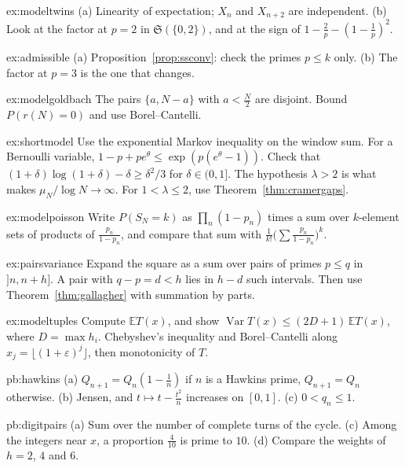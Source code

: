 \begin{hint}{ex:modeltwins}
(a) Linearity of expectation; $X_n$ and $X_{n+2}$ are independent. (b) Look at the factor at $p=2$ in $\mathfrak S(\{0,2\})$, and at the sign of $1-\frac2p-(1-\frac1p)^2$.
\end{hint}
\begin{hint}{ex:admissible}
(a) Proposition~\ref{prop:ssconv}: check the primes $p\le k$ only. (b) The factor at $p=3$ is the one that changes.
\end{hint}
\begin{hint}{ex:modelgoldbach}
The pairs $\{a,N-a\}$ with $a<\frac N2$ are disjoint. Bound $P(r(N)=0)$ and use Borel--Cantelli.
\end{hint}
\begin{hint}{ex:shortmodel}
Use the exponential Markov inequality on the window sum. For a Bernoulli variable, $1-p+pe^{\theta}\le\exp(p(e^{\theta}-1))$. Check that $(1+\delta)\log(1+\delta)-\delta\ge\delta^2/3$ for $\delta\in(0,1]$. The hypothesis $\lambda>2$ is what makes $\mu_N/\log N\to\infty$. For $1<\lambda\le2$, use Theorem~\ref{thm:cramergaps}.
\end{hint}
\begin{hint}{ex:modelpoisson}
Write $P(S_N=k)$ as $\prod_n(1-p_n)$ times a sum over $k$-element sets of products of $\frac{p_n}{1-p_n}$, and compare that sum with $\frac1{k!}\bigl(\sum\frac{p_n}{1-p_n}\bigr)^k$.
\end{hint}
\begin{hint}{ex:pairsvariance}
Expand the square as a sum over pairs of primes $p\le q$ in $]n,n+h]$. A pair with $q-p=d<h$ lies in $h-d$ such intervals. Then use Theorem~\ref{thm:gallagher} with summation by parts.
\end{hint}
\begin{hint}{ex:modeltuples}
Compute $\mathbb ET(x)$, and show $\operatorname{Var}T(x)\le(2D+1)\,\mathbb ET(x)$, where $D=\max h_i$. Chebyshev's inequality and Borel--Cantelli along $x_j=\lfloor(1+\varepsilon)^j\rfloor$, then monotonicity of $T$.
\end{hint}

\begin{hint}{pb:hawkins}
(a) $Q_{n+1}=Q_n(1-\frac1n)$ if $n$ is a Hawkins prime, $Q_{n+1}=Q_n$ otherwise. (b) Jensen, and $t\mapsto t-\frac{t^2}n$ increases on $[0,1]$. (c) $0<q_n\le1$.
\end{hint}

\begin{hint}{pb:digitpairs}
(a) Sum over the number of complete turns of the cycle. (c) Among the integers near $x$, a proportion $\frac4{10}$ is prime to $10$. (d) Compare the weights of $h=2$, $4$ and $6$.
\end{hint}

